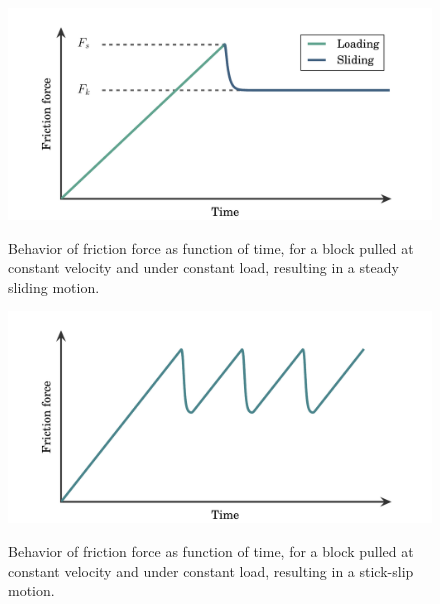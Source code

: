 \documentclass[twoside,english]{uiofysmaster}
\begin{document}
\begin{figure}[H]
	\centering
	\begin{minipage}{\textwidth}
		\centering
		\includegraphics[width=0.7\linewidth]{figures/friction/steadySlide}
		\caption{Behavior of friction force as function of time, for a block pulled at constant velocity and under constant load, resulting in a steady sliding motion.}
		\label{fig:steadyslide}
	\end{minipage}
	\begin{minipage}{\textwidth}
		\vspace{0.5cm}
		\centering
		\includegraphics[width=0.7\linewidth]{figures/friction/stick-slip}
		\caption{Behavior of friction force as function of time, for a block pulled at constant velocity and under constant load, resulting in a stick-slip motion.}
		\label{fig:stick-slip}
	\end{minipage}
	\begin{minipage}{\textwidth}
		\vspace{1cm}
	\end{minipage}
\end{figure}
\end{document}
